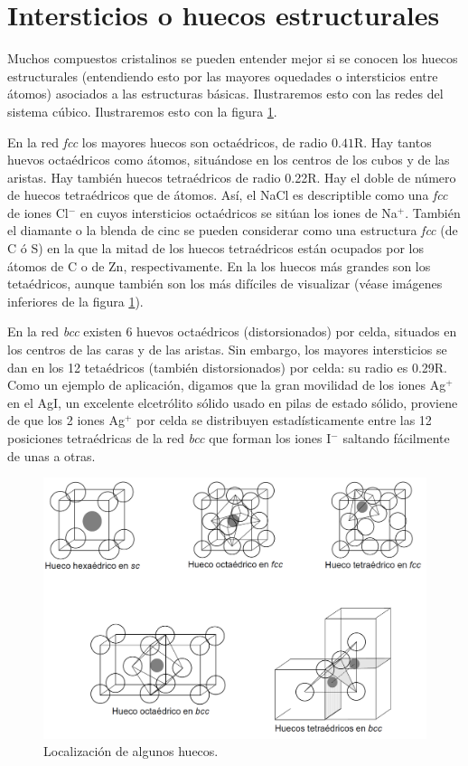 \section{Intersticios o huecos estructurales}

Muchos compuestos cristalinos se pueden entender mejor si se conocen los huecos estructurales (entendiendo esto por las mayores oquedades o intersticios entre átomos) asociados a las estructuras básicas. Ilustraremos esto con las redes del sistema cúbico. Ilustraremos esto con la figura \ref{Fig:01-05}.

En la red \textit{fcc} los mayores huecos son octaédricos, de radio $0.41$R. Hay tantos huevos octaédricos como átomos, situándose en los centros de los cubos y de las aristas. Hay también huecos tetraédricos de radio 0.22R. Hay el doble de número de huecos tetraédricos que de átomos. Así, el NaCl es descriptible como una {\it fcc} de iones Cl$^-$ en cuyos intersticios octaédricos se sitúan los iones de Na$^+$. También el diamante o la blenda de cinc se pueden considerar como una estructura {\it fcc} (de C ó S) en la que la mitad de los huecos tetraédricos están ocupados por los átomos de C o de Zn, respectivamente. En la \bcc  los huecos más grandes son los tetaédricos, aunque también son los más difíciles de visualizar (véase imágenes inferiores de la figura \ref{Fig:01-05}).

En la red {\it bcc} existen 6 huevos octaédricos (distorsionados) por celda, situados en los centros de las caras y de las aristas. Sin embargo, los mayores intersticios se dan en los 12 tetaédricos (también distorsionados) por celda: su radio es 0.29R. Como un ejemplo de aplicación, digamos que la gran movilidad de los iones Ag$^+$ en el AgI, un excelente elcetrólito sólido usado en pilas de estado sólido, proviene de que los 2 iones Ag$^+$ por celda se distribuyen estadísticamente entre las 12 posiciones tetraédricas de la red {\it bcc} que forman los iones I$^-$ saltando fácilmente de unas a otras.


\begin{figure}[h!] \centering
    \includegraphics[scale=0.4]{Cuerpo/Ch_01/huecos.png}
    \caption{Localización de algunos huecos.}
    \label{Fig:01-05}
\end{figure}


